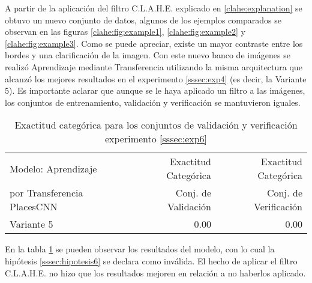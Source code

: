 A partir de la aplicación del filtro C.L.A.H.E. explicado en \ref{clahe:explanation} se obtuvo un nuevo conjunto de datos, algunos de los ejemplos comparados se observan en las figuras \ref{clahe:fig:example1}, \ref{clahe:fig:example2} y \ref{clahe:fig:example3}. Como se puede apreciar, existe un mayor contraste entre los bordes y una clarificación de la imagen. Con este nuevo banco de imágenes se realizó Aprendizaje mediante Transferencia utilizando la misma arquitectura que alcanzó los mejores resultados en el experimento \ref{sssec:exp4} (es decir, la Variante 5). Es importante aclarar que aunque se le haya aplicado un filtro a las imágenes, los conjuntos de entrenamiento, validación y verificación se mantuvieron iguales.


\begin{table}[h!]
	\centering
	\begin{tabular}{| l | r | r |}
		\toprule
		Modelo: Aprendizaje & Exactitud Categórica &  Exactitud Categórica \\
		por Transferencia PlacesCNN & Conj. de Validación &  Conj. de Verificación \\
		\midrule
		Variante 5 & 0.00 & 0.00 \\
		\bottomrule
	\end{tabular}
	\caption{Exactitud categórica para los conjuntos de validación y verificación experimento \ref{sssec:exp6}}
	\label{exp6:results}
\end{table}

En la tabla \ref{exp6:results} se pueden observar los resultados del modelo, con lo cual la hipótesis \ref{sssec:hipotesis6} se declara como inválida. El hecho de aplicar el filtro C.L.A.H.E. no hizo que los resultados mejoren en relación a no haberlos aplicado.


